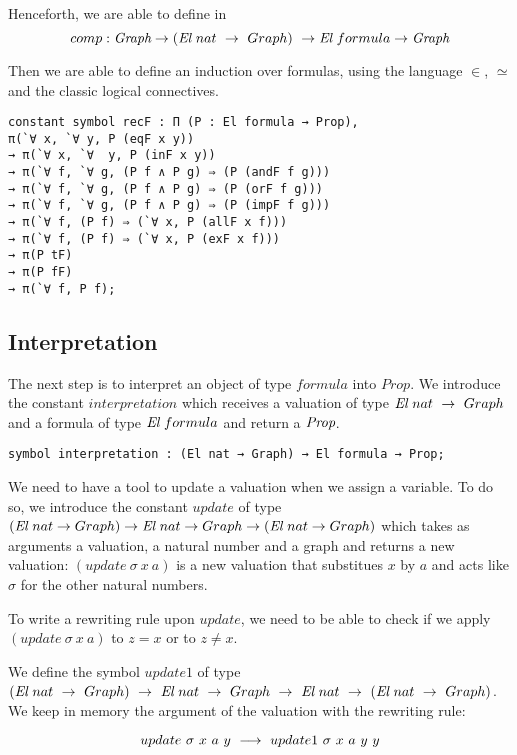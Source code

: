\documentclass[a4paper]{article}
\begin{document}
Henceforth, we are able to define in \dedukti
$$comp : {\mbox{\it Graph}} \rightarrow ({\mbox{\it El}} \ nat \ \rightarrow \ Graph) \  \rightarrow {\mbox{\it El}} \ formula \rightarrow {\mbox{\it Graph}}$$

Then we are able to define an induction over formulas, using the language $\in$, $\simeq$ and the classic logical connectives.

\begin{lstlisting}
constant symbol recF : Π (P : El formula → Prop), 
π(`∀ x, `∀ y, P (eqF x y))
→ π(`∀ x, `∀  y, P (inF x y))
→ π(`∀ f, `∀ g, (P f ∧ P g) ⇒ (P (andF f g)))
→ π(`∀ f, `∀ g, (P f ∧ P g) ⇒ (P (orF f g)))
→ π(`∀ f, `∀ g, (P f ∧ P g) ⇒ (P (impF f g)))
→ π(`∀ f, (P f) ⇒ (`∀ x, P (allF x f)))
→ π(`∀ f, (P f) ⇒ (`∀ x, P (exF x f)))
→ π(P tF)
→ π(P fF)
→ π(`∀ f, P f);
\end{lstlisting}

\subsection{Interpretation}

The next step is to interpret an object of type $formula$ into $Prop$. We introduce the constant $interpretation$ which receives a valuation of type ${\mbox{\it El}} \ nat \ \rightarrow \ Graph$ and a formula of type ${\mbox{\it El}} \ formula$ and return a ${\mbox{\it Prop}}$.

\begin{lstlisting}
symbol interpretation : (El nat → Graph) → El formula → Prop;
\end{lstlisting} 

We need to have a tool to update a valuation when we assign a variable. To do so, we introduce the constant $update$ of type $({\mbox{\it El}} \ nat \rightarrow Graph) \rightarrow {\mbox{\it El}} \ nat \rightarrow Graph \rightarrow ({\mbox{\it El}} \ nat \rightarrow Graph)$ which takes as arguments a valuation, a natural number and a graph and returns a new valuation: $(update \ \sigma \ x \ a)$ is a new valuation that substitues $x$ by $a$ and acts like $\sigma$ for the other natural numbers.

To write a rewriting rule upon $update$, we need to be able to check if we apply $(update \ \sigma \ x \ a)$ to $z = x$ or to $z \neq x$.

We define the symbol $update1$ of type $(\El \ nat \ \ra \ Graph) \ \ra \ \El \ nat \ \ra \ Graph \ \ra \ \El \ nat \ \ra \ (\El \ nat \ \ra \ Graph)$. We keep in memory the argument of the valuation with the rewriting rule:

$$update \ \sigma \ x \ a \ y \ \lra \ update1 \ \sigma \ x \ a \ y \ y$$
\end{document}

